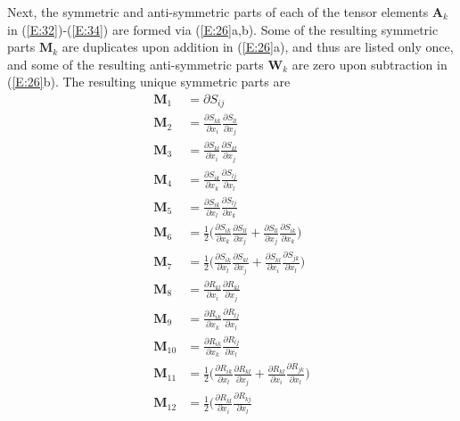 Next, the symmetric and anti-symmetric parts of each of the tensor elements  $\mathbf{A}_k$in (\ref{E:32})-(\ref{E:34}) are formed via (\ref{E:26}a,b).  Some of the resulting symmetric parts $\mathbf{M}_k$  are duplicates upon addition in (\ref{E:26}a), and thus are listed only once, and some of the resulting anti-symmetric parts $\mathbf{W}_k$  are zero upon subtraction in (\ref{E:26}b).  The resulting unique symmetric parts are
%
\begin{subequations}
\label{E:36}
\begin{align}
	\mathbf{M}_1  &= \partial S_{ij}  \\
	\mathbf{M}_2  &= \frac{\partial S_{kk}}{\partial x_i}
					 \frac{\partial S_{ll}}{\partial x_j} \\
	\mathbf{M}_3  &= \frac{\partial S_{kl}}{\partial x_i}
					 \frac{\partial S_{kl}}{\partial x_j} \\
	\mathbf{M}_4  &= \frac{\partial S_{ik}}{\partial x_k}
					 \frac{\partial S_{lj}}{\partial x_l} \\	
	\mathbf{M}_5  &= \frac{\partial S_{ik}}{\partial x_l}
					 \frac{\partial S_{lj}}{\partial x_k} \\	
	\mathbf{M}_6  &= \frac{1}{2} 
			  \bigg( \frac{\partial S_{ik}}{\partial x_k}
					 \frac{\partial S_{ll}}{\partial x_j} 
				  	+ 
					 \frac{\partial S_{ll}}{\partial x_j} 
					 \frac{\partial S_{ik}}{\partial x_k} \bigg) \\	
	\mathbf{M}_7  &= \frac{1}{2} 
			  \bigg( \frac{\partial S_{ik}}{\partial x_l}
					 \frac{\partial S_{kl}}{\partial x_j} 
				    + 
					 \frac{\partial S_{kl}}{\partial x_i} 
					 \frac{\partial S_{jk}}{\partial x_l} \bigg) \\				 
	\mathbf{M}_8  &= \frac{\partial R_{kl}}{\partial x_i}
					 \frac{\partial R_{kl}}{\partial x_j} \\
	\mathbf{M}_9  &= \frac{\partial R_{ik}}{\partial x_k}
					 \frac{\partial R_{lj}}{\partial x_l} \\
	\mathbf{M}_{10} &= \frac{\partial R_{ik}}{\partial x_k}
					 \frac{\partial R_{lj}}{\partial x_l} \\
	\mathbf{M}_{11}  &= \frac{1}{2} 
			  \bigg( \frac{\partial R_{ik}}{\partial x_l}
					 \frac{\partial R_{kl}}{\partial x_j} 
				  	+ 
					 \frac{\partial R_{kl}}{\partial x_i} 
					 \frac{\partial R_{jk}}{\partial x_l} \bigg) \\
	\mathbf{M}_{12}  &= \frac{1}{2} 
			  \bigg( \frac{\partial R_{kl}}{\partial x_i}
					 \frac{\partial R_{kj}}{\partial x_l} 

\end{align}
\end{subequations}
